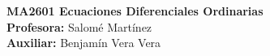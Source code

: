\noindent \textbf{MA2601 Ecuaciones Diferenciales Ordinarias}\\
\textbf{Profesora:} Salomé Martínez\\
\textbf{Auxiliar:} Benjamín Vera Vera
